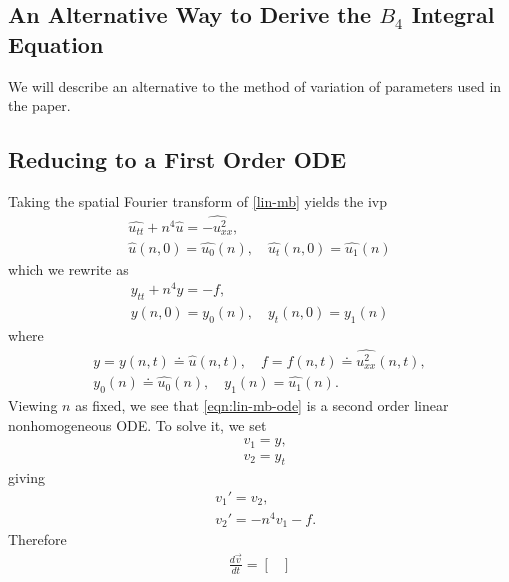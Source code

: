 \documentclass[12pt,reqno]{amsart}
\numberwithin{equation}{section}  %
\newcommand{\wh}{\widehat}
\begin{document}
\begin{appendices}
\section{An Alternative Way to Derive the $B_{4}$ Integral Equation}
\label{ssec:integral-form-deriv}
We will describe an alternative to the method of variation of parameters used in
the paper. 
%
%
\subsection{Reducing to a First Order ODE} 
\label{ssec:first-order-ode}
Taking the spatial Fourier transform of \eqref{lin-mb} yields
the ivp
%
%
\begin{gather*}
  \wh{u_{tt}} + n^{4} \wh{u} = \wh{-u^{2}_{xx}},
  \\
  \wh{u}(n, 0) = \wh{u_{0}}(n), \quad \wh{u_{t}}(n, 0) = \wh{u_{1}}(n)
\end{gather*}
%
%
which we rewrite as 
%
%
\begin{gather}
  \label{eqn:lin-mb-ode}
  y_{tt} + n^{4}y = -f,
  \\
  y(n, 0) = y_{0}(n), \quad y_{t}(n, 0) = y_{1}(n)
\label{eqn:lin-mb-ode-init-data}
\end{gather}
%
%
where
%
%
\begin{gather*}
  \label{not-1}
  y = y(n, t) \doteq \wh{u}(n, t), \quad f = f(n, t) \doteq
  \wh{u^{2}_{xx}}(n,t),
  \\
  \label{not-2}
  y_{0}(n) \doteq \wh{u_{0}}(n), \quad y_{1}(n) = \wh{u_{1}}(n).
\end{gather*}
%
%
Viewing $n$ as fixed, we see that \eqref{eqn:lin-mb-ode} is a second order
linear nonhomogeneous ODE. To solve it, we set 
%
%
\begin{equation*}
  \label{not-3}
\begin{split}
   & v_{1} = y, 
   \\
   & v_{2} = y_{t}
\end{split}
\end{equation*}
%
%
giving
%
%
\begin{equation*}
\begin{split}
  & v_{1}' = v_{2},
  \\
  & v_{2}' = -n^{4}v_{1} - f.
\end{split}
\end{equation*}
%
%
Therefore 
%
%
\begin{equation}
\begin{split}
\frac{d \vec v}{dt} = 
\begin{bmatrix}

\end{bmatrix}
\end{split}
\end{equation}
\end{appendices}
\end{document}
